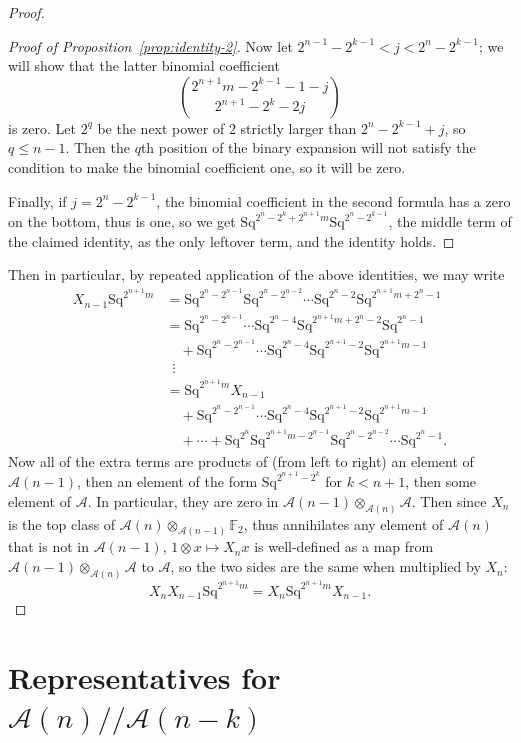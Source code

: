 \documentclass{article}
\newcommand{\A}{\mathcal{A}}
\newcommand{\F}{\mathbb{F}}
\newcommand{\Sq}{\mathrm{Sq}}
\newcommand{\mmod}{/\!/\!}
\begin{document}
\begin{proof}
\begin{proof}[Proof of Proposition~\ref{prop:identity-2}]
    Now let $2^{n-1}-2^{k-1}<j<2^n-2^{k-1}$; we will show that the latter binomial coefficient
    \[\binom{2^{n+1}m-2^{k-1}-1-j}{2^{n+1}-2^k-2j}\]
    is zero.  Let $2^q$ be the next power of $2$ strictly larger than $2^n-2^{k-1}+j$, so $q\leq n-1$.  Then the $q$th position of the binary expansion will not satisfy the condition to make the binomial coefficient one, so it will be zero.

    Finally, if $j=2^n-2^{k-1}$, the binomial coefficient in the second formula has a zero on the bottom, thus is one, so we get $\Sq^{2^n-2^k+2^{n+1}m}\Sq^{2^n-2^{k-1}}$, the middle term of the claimed identity, as the only leftover term, and the identity holds.
  \end{proof}

  Then in particular, by repeated application of the above identities, we may write
  \begin{align*}
    X_{n-1}\Sq^{2^{n+1}m} &= \Sq^{2^n-2^{n-1}}\Sq^{2^n-2^{n-2}}\cdots\Sq^{2^n-2}\Sq^{2^{n+1}m+2^n-1} \\
      &= \Sq^{2^n-2^{n-1}}\cdots\Sq^{2^n-4}\Sq^{2^{n+1}m+2^n-2}\Sq^{2^n-1} \\
      &\quad + \Sq^{2^n-2^{n-1}}\cdots\Sq^{2^n-4}\Sq^{2^{n+1}-2}\Sq^{2^{n+1}m-1}\\
      &\ \;\vdots \\
      &=\Sq^{2^{n+1}m}X_{n-1}\\
      &\quad + \Sq^{2^n-2^{n-1}}\cdots\Sq^{2^n-4}\Sq^{2^{n+1}-2}\Sq^{2^{n+1}m-1}\\
      &\quad + \cdots + \Sq^{2^n}\Sq^{2^{n+1}m-2^{n-1}}\Sq^{2^n-2^{n-2}}\cdots\Sq^{2^n-1}.
  \end{align*}
  Now all of the extra terms are products of (from left to right) an element of $\A(n-1)$, then an element of the form $\Sq^{2^{n+1}-2^k}$ for $k<n+1$, then some element of $\A$.  In particular, they are zero in $\A(n-1)\otimes_{\A(n)}\A$.  Then since $X_n$ is the top class of $\A(n)\otimes_{\A(n-1)}\F_2$, thus annihilates any element of $\A(n)$ that is not in $\A(n-1)$, $1\otimes x\mapsto X_nx$ is well-defined as a map from $\A(n-1)\otimes_{\A(n)}\A$ to $\A$, so the two sides are the same when multiplied by $X_n$:
  \[X_nX_{n-1}\Sq^{2^{n+1}m} = X_n\Sq^{2^{n+1}m}X_{n-1}.\]

\end{proof}

\section{Representatives for \boldmath$\A(n)\mmod\A(n-k)$}\label{sec:reps}
\end{document}
